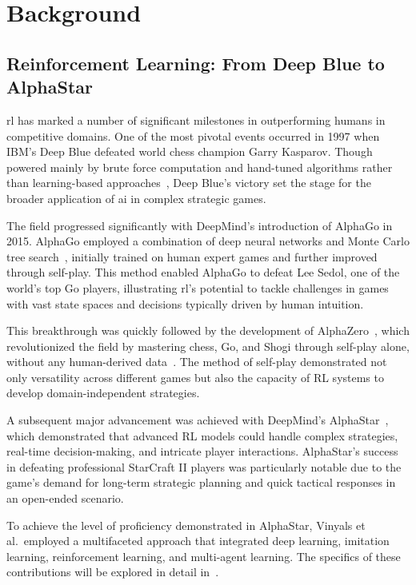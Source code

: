 \section{Background}%
\label{sec:background}

    \subsection*{Reinforcement Learning: From Deep Blue to AlphaStar}%

\Gls{rl} has marked a number of significant milestones in outperforming humans in 
competitive domains. One of the most pivotal events occurred in 1997 
when IBM's Deep Blue defeated world chess champion Garry Kasparov. 
Though powered mainly by brute force computation and hand-tuned algorithms
rather than learning-based approaches~\cite{campbell2002}, Deep Blue's victory set 
the stage for the broader application of \gls{ai} in complex strategic games.

The field progressed significantly with DeepMind's introduction of AlphaGo in 2015. AlphaGo 
employed a combination of deep neural networks and Monte Carlo tree search~\cite{silver2016},
initially trained on human expert games and further improved through self-play.
This method enabled AlphaGo to defeat Lee Sedol, one of the world's top Go players, 
illustrating \gls{rl}'s potential to tackle challenges in games with vast state spaces and 
decisions typically driven by human intuition.

This breakthrough was quickly followed by the development of AlphaZero~\cite{silver2017},
which revolutionized the field by mastering chess, Go, and Shogi through self-play alone,
without any human-derived data~\cite{silver2017a}.
The method of self-play demonstrated not only versatility across different games but also the
capacity of RL systems to develop domain-independent strategies.

A subsequent major advancement was achieved with DeepMind's AlphaStar~\cite{vinyals2019},
which demonstrated that advanced RL models could handle complex strategies,
real-time decision-making, and intricate player interactions. AlphaStar's success in 
defeating professional StarCraft II players was particularly notable due to the game's demand 
for long-term strategic planning and quick tactical responses in an open-ended scenario.

To achieve the level of proficiency demonstrated in AlphaStar, Vinyals et al.~employed a 
multifaceted approach that integrated deep learning, imitation learning, reinforcement learning, 
and multi-agent learning. The specifics of these contributions will be explored in 
detail in~.

